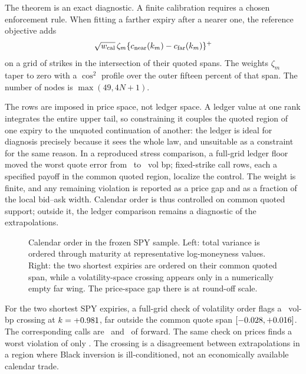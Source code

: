 The theorem is an exact diagnostic.  A finite calibration requires a chosen
enforcement rule.  When fitting a farther expiry after a nearer one, the
reference objective adds
\begin{equation}
\sqrt{w_{\rm cal}}\,\zeta_m
\{c_{\rm near}(k_m)-c_{\rm far}(k_m)\}^+
\label{eq:calrows}
\end{equation}
on a grid of strikes in the intersection of their quoted spans.  The weights
$\zeta_m$ taper to zero with a $\cos^2$ profile over the outer fifteen percent
of that span.  The number of nodes is $\max(49,4N+1)$.

The rows are imposed in price space, not ledger space.  A ledger value at
one rank integrates the entire upper tail, so constraining it couples the
quoted region of one expiry to the unquoted continuation of another: the
ledger is ideal for diagnosis precisely because it sees the whole law, and
unsuitable as a constraint for the same reason.  In a reproduced stress
comparison, a full-grid ledger floor moved the worst quote error from
\MacPhantomDragFromBp\ to \MacPhantomDragToBp\ vol bp; fixed-strike call
rows, each a specified payoff in the common quoted region, localize the
control.  The weight is finite, and any remaining violation is reported as a
price gap and as a fraction of the local bid--ask width.  Calendar order is
thus controlled on common quoted support; outside it, the ledger comparison
remains a diagnostic of the extrapolations.

\begin{figure}[htbp]
\centering
{}
\caption{Calendar order in the frozen SPY sample.  Left: total variance is
ordered through maturity at representative log-moneyness values.  Right: the
two shortest expiries are ordered on their common quoted span, while a
volatility-space crossing appears only in a numerically empty far wing.  The
price-space gap there is at round-off scale.}
\label{fig:calendar}
\end{figure}

For the two shortest SPY expiries, a full-grid check of volatility order
flags a \MacCalGapVolBp\ vol-bp crossing at $k=+0.981$, far
outside the common quote span $[-0.028,+0.016]$.  The
corresponding calls are \MacCalendarCallShort\ and \MacCalendarCallLong\ of
forward.  The same check on prices finds a worst violation of only
\MacCalPriceGridWorst.  The
crossing is a disagreement between extrapolations in a region where Black
inversion is ill-conditioned, not an economically available calendar trade.
